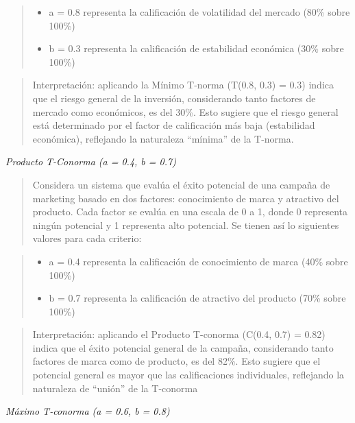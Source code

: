 \documentclass[
  a4paper,
  DIV=11,
  numbers=noendperiod]{scrreprt}
\providecommand{\tightlist}{%
  \setlength{\itemsep}{0pt}\setlength{\parskip}{0pt}}\usepackage{longtable,booktabs,array}
\begin{document}
\begin{quote}
\begin{itemize}
\tightlist
\item
  a = 0.8 representa la calificación de volatilidad del mercado (80\%
  sobre 100\%)
\item
  b = 0.3 representa la calificación de estabilidad económica (30\%
  sobre 100\%)
\end{itemize}
\end{quote}

\begin{quote}
Interpretación: aplicando la Mínimo T-norma (T(0.8, 0.3) = 0.3) indica
que el riesgo general de la inversión, considerando tanto factores de
mercado como económicos, es del 30\%. Esto sugiere que el riesgo general
está determinado por el factor de calificación más baja (estabilidad
económica), reflejando la naturaleza ``mínima'' de la T-norma.
\end{quote}

\emph{Producto T-Conorma (a = 0.4, b = 0.7)}

\begin{quote}
Considera un sistema que evalúa el éxito potencial de una campaña de
marketing basado en dos factores: conocimiento de marca y atractivo del
producto. Cada factor se evalúa en una escala de 0 a 1, donde 0
representa ningún potencial y 1 representa alto potencial. Se tienen así
lo siguientes valores para cada criterio:
\end{quote}

\begin{quote}
\begin{itemize}
\tightlist
\item
  a = 0.4 representa la calificación de conocimiento de marca (40\%
  sobre 100\%)
\item
  b = 0.7 representa la calificación de atractivo del producto (70\%
  sobre 100\%)
\end{itemize}
\end{quote}

\begin{quote}
Interpretación: aplicando el Producto T-conorma (C(0.4, 0.7) = 0.82)
indica que el éxito potencial general de la campaña, considerando tanto
factores de marca como de producto, es del 82\%. Esto sugiere que el
potencial general es mayor que las calificaciones individuales,
reflejando la naturaleza de ``unión'' de la T-conorma
\end{quote}

\emph{Máximo T-conorma (a = 0.6, b = 0.8)}
\end{document}
